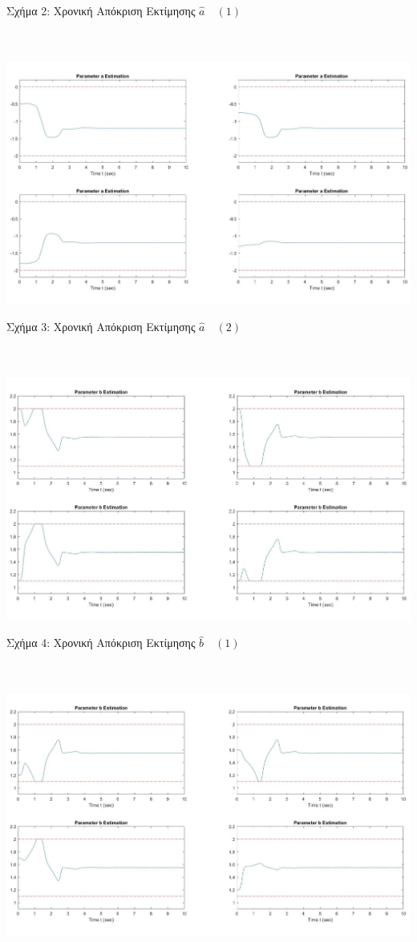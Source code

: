 \documentclass[12pt]{article}
\begin{document}
\centerline{Σχήμα 2: Χρονική Απόκριση Εκτίμησης $\hat{a} \quad (1)$}
\\ \\
\includegraphics[width=\linewidth]{a_est_a2.jpg}
\centerline{Σχήμα 3: Χρονική Απόκριση Εκτίμησης $\hat{a} \quad (2)$}
\\ \\
\includegraphics[width=\linewidth]{b_est_a1.jpg}
\centerline{Σχήμα 4: Χρονική Απόκριση Εκτίμησης $\hat{b} \quad (1)$}
\\ \\
\includegraphics[width=\linewidth]{b_est_a2.jpg}
\end{document}
